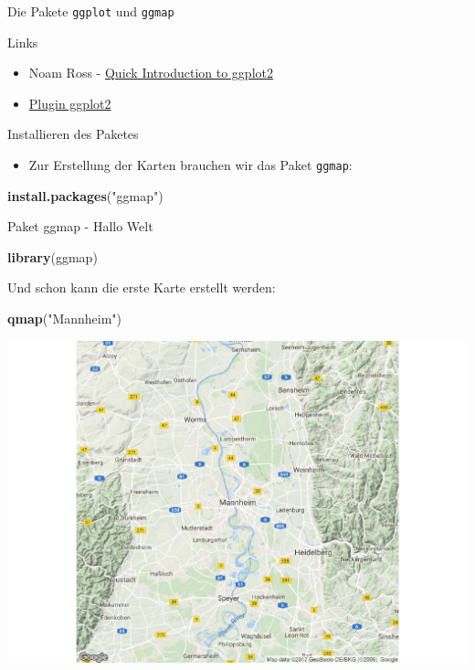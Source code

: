 \documentclass[ignorenonframetext,]{beamer}
\newenvironment{Shaded}{}{}
\newcommand{\KeywordTok}[1]{\textcolor[rgb]{0.00,0.44,0.13}{\textbf{{#1}}}}
\newcommand{\StringTok}[1]{\textcolor[rgb]{0.25,0.44,0.63}{{#1}}}
\newcommand{\NormalTok}[1]{{#1}}
\providecommand{\tightlist}{%
\setlength{\itemsep}{0pt}\setlength{\parskip}{0pt}}
\begin{document}
\begin{frame}[fragile]{Die Pakete \texttt{ggplot} und \texttt{ggmap}}
\begin{block}{Links}
\begin{itemize}
\item
  Noam Ross -
  \href{http://www.noamross.net/blog/2012/10/5/ggplot-introduction.html}{Quick
  Introduction to ggplot2}
\item
  \href{https://www.r-bloggers.com/rcmdrplugin-kmggplot2_0-2-4-is-on-cran/}{Plugin
  ggplot2}
\end{itemize}

\end{block}

\begin{block}{Installieren des Paketes}

\begin{itemize}
\tightlist
\item
  Zur Erstellung der Karten brauchen wir das Paket \texttt{ggmap}:
\end{itemize}

\begin{Shaded}
\begin{Highlighting}[]
\KeywordTok{install.packages}\NormalTok{(}\StringTok{"ggmap"}\NormalTok{)}
\end{Highlighting}
\end{Shaded}

\end{block}

\begin{block}{Paket ggmap - Hallo Welt}

\begin{Shaded}
\begin{Highlighting}[]
\KeywordTok{library}\NormalTok{(ggmap)}
\end{Highlighting}
\end{Shaded}

Und schon kann die erste Karte erstellt werden:

\begin{Shaded}
\begin{Highlighting}[]
\KeywordTok{qmap}\NormalTok{(}\StringTok{"Mannheim"}\NormalTok{)}
\end{Highlighting}
\end{Shaded}

\includegraphics{R_intern_files/figure-beamer/unnamed-chunk-253-1.pdf}


\end{block}
\end{frame}
\end{document}
